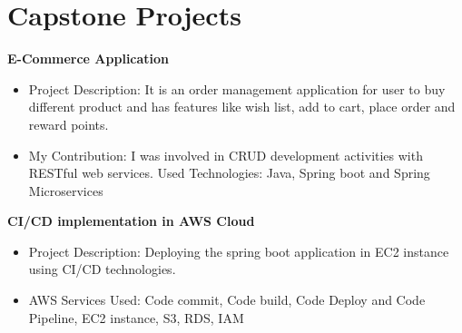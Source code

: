 \documentclass[letterpaper,10pt]{article}
\makeatletter
\newcommand{\resumeItem}[1]{
  \item\small{
    {#1 \vspace{-3pt}}
  }
}
\newcommand{\resumeSubheading}[4]{
  \vspace{-2pt}\item
    \begin{tabular*}{0.97\textwidth}[t]{l@{\extracolsep{\fill}}r}
      \textbf{#1} & #2 \\
      \textit{\small#3} & \textit{\small #4} \\
    \end{tabular*}\vspace{-7pt}
}
\newcommand{\resumeSubHeadingListStart}{\begin{itemize}[leftmargin=0.15in, label={}]}
\newcommand{\resumeSubHeadingListEnd}{\end{itemize}}
\newcommand{\resumeItemListStart}{\begin{itemize}}
\newcommand{\resumeItemListEnd}{\end{itemize}\vspace{-5pt}}
\makeatother
\begin{document}
 \section{Capstone Projects}
 \vspace{6pt}
 \resumeSubHeadingListStart
 \small{\item{
\textbf{ E-Commerce Application} \vspace{-4pt}
 \resumeItemListStart
	            \resumeItem{Project Description: It is an order management application for user to buy different product and has features like wish list, add to cart, place order and reward points.}
       		 \resumeItem{My Contribution: I was involved in CRUD development activities with RESTful web services. Used Technologies: Java, Spring boot and Spring Microservices}
        \resumeItemListEnd
 \vspace{2pt}
\textbf{CI/CD implementation in AWS Cloud} \vspace{-4pt}

 \resumeItemListStart
	            \resumeItem{Project Description: Deploying the spring boot application in EC2 instance using CI/CD technologies.}
		 \resumeItem{AWS Services Used: Code commit, Code build, Code Deploy and Code Pipeline, EC2 instance, S3, RDS, IAM}
        \resumeItemListEnd

       
 }}
\resumeSubHeadingListEnd
 \begin{comment}
\section{Internship Experience}
  \vspace{6pt}
  \resumeSubHeadingListStart

    \resumeSubheading
      {\textbf{\href{https://www.chainsys.com/}{Chain-Sys India Pvt Ltd}}}{{\href{https://maps.app.goo.gl/CkDDxi68E4NwArMKA}{Chennai, TamilNadu}}}
      {Oracle Fusion Consultant}{Mar 2021 \textbf{--} Sep 2021, Internship}
        \resumeItemListStart
            \resumeItem{Worked as an Oracle Fusion Consultant, I excelled in BI, OTBI report development, Oracle E-Business Suite optimization, data analysis, and dashboard creation within Oracle Fusion instances.}
            \resumeItem{Leveraging SQL and PL/SQL, I crafted comprehensive reports, optimized EBS applications, and implemented insightful dashboards, contributing to efficient and data-driven business processes.}
            \resumeItem{Worked as OIC consultant for top-tier singapore clients.}
        \resumeItemListEnd

  \resumeSubHeadingListEnd
 \end{comment}
\end{document}
